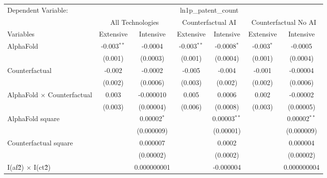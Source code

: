 \begingroup
\centering
\begin{tabular}{lcccccc}
   \tabularnewline \midrule \midrule
   Dependent Variable: & \multicolumn{6}{c}{ln1p\_patent\_count}\\
 & \multicolumn{2}{c}{All Technologies} & \multicolumn{2}{c}{Counterfactual AI} & \multicolumn{2}{c}{Counterfactual No AI} \\
\cmidrule(lr){1-1}\cmidrule(lr){2-3} \cmidrule(lr){4-5} \cmidrule(lr){6-7}
Variables & \multicolumn{1}{c}{Extensive} & \multicolumn{1}{c}{Intensive} & \multicolumn{1}{c}{Extensive} & \multicolumn{1}{c}{Intensive} & \multicolumn{1}{c}{Extensive} & \multicolumn{1}{c}{Intensive} \\
\cmidrule(lr){1-1}\cmidrule(lr){2-2} \cmidrule(lr){3-3} \cmidrule(lr){4-4} \cmidrule(lr){5-5} \cmidrule(lr){6-6} \cmidrule(lr){7-7}
   AlphaFold                          & -0.003$^{**}$ & -0.0004       & -0.003$^{**}$ & -0.0008$^{*}$  & -0.003$^{*}$ & -0.0005\\   
                                      & (0.001)       & (0.0003)      & (0.001)       & (0.0004)       & (0.001)      & (0.0004)\\   
   Counterfactual                     & -0.002        & -0.0002       & -0.005        & -0.004         & -0.001       & -0.00004\\   
                                      & (0.002)       & (0.0006)      & (0.003)       & (0.002)        & (0.002)      & (0.0006)\\   
   AlphaFold $\times$ Counterfactual  & 0.003         & -0.000010     & 0.005         & 0.0006         & 0.002        & -0.00002\\   
                                      & (0.003)       & (0.00004)     & (0.006)       & (0.0008)       & (0.003)      & (0.00005)\\   
   AlphaFold square                   &               & 0.00002$^{*}$ &               & 0.00003$^{**}$ &              & 0.00002$^{**}$\\   
                                      &               & (0.000009)    &               & (0.00001)      &              & (0.000009)\\   
   Counterfactual square              &               & 0.000007      &               & 0.0002         &              & 0.000004\\   
                                      &               & (0.00002)     &               & (0.0002)       &              & (0.00002)\\   
   I(af\^2) $\times$ I(ct\^2)         &               & 0.000000001   &               & -0.000004      &              & 0.000000004\\   

\end{tabular}
